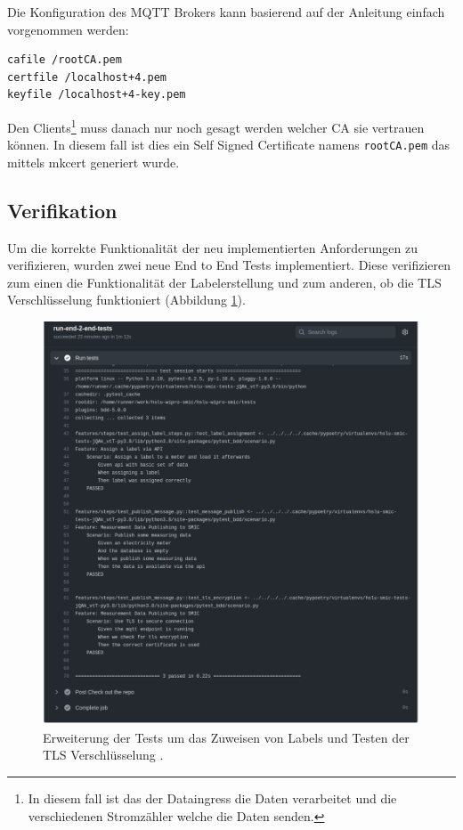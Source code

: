 Die Konfiguration des \ac{MQTT} Brokers kann basierend auf der Anleitung \parencite{mosquitto.conf_man_page_2021}
einfach vorgenommen werden:

\begin{verbatim}
cafile /rootCA.pem
certfile /localhost+4.pem
keyfile /localhost+4-key.pem
\end{verbatim}

Den Clients\footnote{
    In diesem fall ist das der Dataingress die Daten verarbeitet und die verschiedenen
    Stromzähler welche die Daten senden.
} muss danach nur noch gesagt werden welcher \ac{CA} sie vertrauen können.
In diesem fall ist dies ein Self Signed Certificate namens \texttt{rootCA.pem} das mittels
mkcert generiert wurde.

\subsection{Verifikation}

Um die korrekte Funktionalität der neu implementierten Anforderungen zu verifizieren, wurden
zwei neue End to End Tests implementiert. Diese verifizieren zum einen die Funktionalität der
Labelerstellung und zum anderen, ob die \ac{TLS} Verschlüsselung funktioniert (Abbildung \ref{fig:test-iteration-3}).

\begin{figure}[H]
    \centering
    \includegraphics[width=1.0\textwidth]{gfx/testlog-iteration-2}
    \caption{
        Erweiterung der Tests um das Zuweisen von Labels und Testen der \ac{TLS} Verschlüsselung \parencite{randombenj_testlog_it_2_2021}.
    }
    \label{fig:test-iteration-3}
\end{figure}

